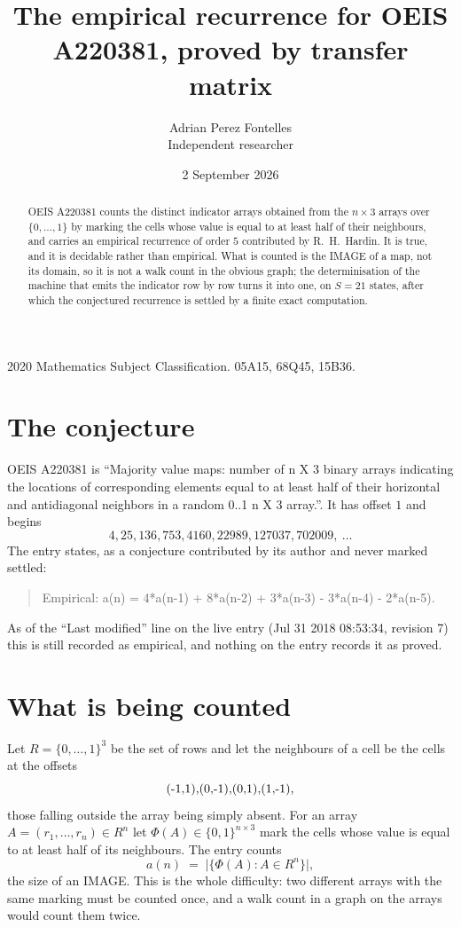 \documentclass[11pt,a4paper]{article}
\title{The empirical recurrence for OEIS A220381, proved by transfer matrix}
\author{Adrian Perez Fontelles\\ \small Independent researcher}
\date{2 September 2026}
\theoremstyle{plain}
\theoremstyle{definition}
\begin{document}
\maketitle

\begin{abstract}
OEIS A220381 counts the distinct indicator arrays obtained from the $n\times3$ arrays over
$\{0,\dots,1\}$ by marking the cells whose value is equal to at least half of their neighbours, and carries an
empirical recurrence of order $5$ contributed by R.~H.~Hardin. It is true, and it is
decidable rather than empirical. What is counted is the IMAGE of a map, not its domain, so it
is not a walk count in the obvious graph; the determinisation of the machine that emits the
indicator row by row turns it into one, on $S=21$ states, after which the conjectured
recurrence is settled by a finite exact computation.
\end{abstract}

\noindent\small 2020 Mathematics Subject Classification. 05A15, 68Q45, 15B36.\normalsize

\section{The conjecture}

OEIS A220381 is ``Majority value maps: number of n X 3 binary arrays indicating the locations of corresponding elements equal to at least half of their horizontal and antidiagonal neighbors in a random 0..1 n X 3 array.''. It has offset $1$ and begins
\[
4, 25, 136, 753, 4160, 22989, 127037, 702009,\ \dots
\]
The entry states, as a conjecture contributed by its author and never marked settled:
\begin{quote}
Empirical: a(n) = 4*a(n-1) + 8*a(n-2) + 3*a(n-3) - 3*a(n-4) - 2*a(n-5).
\end{quote}
As of the ``Last modified'' line on the live entry (Jul 31 2018 08:53:34, revision 7) this is still
recorded as empirical, and nothing on the entry records it as proved.

\section{What is being counted}

Let $R=\{0,\dots,1\}^{3}$ be the set of rows and let the neighbours of a cell be the
cells at the offsets
\[
$(-1,1)$, $(0,-1)$, $(0,1)$, $(1,-1)$,
\]
those falling outside the array being simply absent. For an array
$A=(r_1,\dots,r_n)\in R^n$ let $\Phi(A)\in\{0,1\}^{n\times3}$ mark the cells whose value
is equal to at least half of its neighbours. The entry counts
\[
a(n)\;=\;\bigl|\{\Phi(A):A\in R^n\}\bigr| ,
\]
the size of an IMAGE. This is the whole difficulty: two different arrays with the same marking
must be counted once, and a walk count in a graph on the arrays would count them twice.
\end{document}
